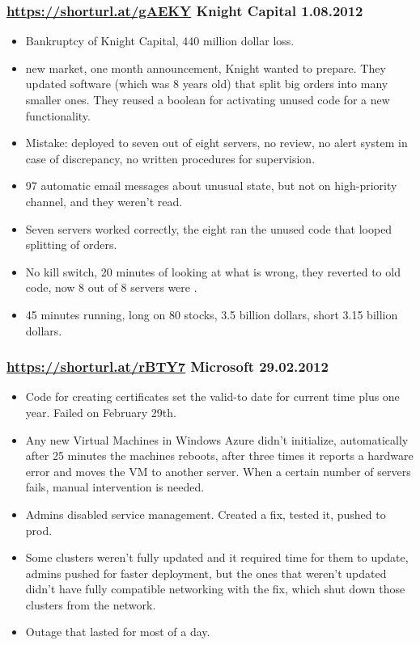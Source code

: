 \documentclass[handout]{beamer}
\begin{document}
 \begin{frame}
	\frametitle{
		\href{https://shorturl.at/gAEKY}{https://shorturl.at/gAEKY}
		Knight Capital
		1.08.2012
	}
	\begin{itemize}
		\item \pause Bankruptcy of Knight Capital, 440 million dollar loss. \pause
		\item new market, one month announcement, Knight wanted to prepare.
			They updated software (which was 8 years old) that split big orders into many smaller ones.
			They reused a boolean for activating unused code for a new functionality. \pause
		\item Mistake: deployed to seven out of eight servers, no review, no alert system in case of discrepancy, no written procedures for supervision. \pause
		\item 97 automatic email messages about unusual state, but not on high-priority channel, and they weren't read. \pause
		\item Seven servers worked correctly, the eight ran the unused code that looped splitting of orders. \pause
		\item No kill switch, 20 minutes of looking at what is wrong, they reverted to old code, now 8 out of 8 servers were .
		\item 45 minutes running, long on 80 stocks, 3.5 billion dollars, short 3.15 billion dollars.
	\end{itemize}
 \end{frame}

 \begin{frame}
	 \frametitle{
		 \href{https://shorturl.at/rBTY7}{https://shorturl.at/rBTY7}
		 Microsoft
		 29.02.2012
	 }
	 \begin{itemize}
		\item Code for creating certificates set the valid-to date for current time plus one year.
			Failed on February 29th. \pause
		\item Any new Virtual Machines in Windows Azure didn't initialize, automatically after 25 minutes the machines reboots, after three times it reports a hardware error and moves the VM to another server. When a certain number of servers fails, manual intervention is needed. \pause
		\item Admins disabled service management. Created a fix, tested it, pushed to prod. \pause
		\item Some clusters weren't fully updated and it required time for them to update, admins pushed for faster deployment, but the ones that weren't updated didn't have fully compatible networking with the fix, which shut down those clusters from the network. \pause
		\item Outage that lasted for most of a day.
	 \end{itemize}
 \end{frame}
\end{document}
